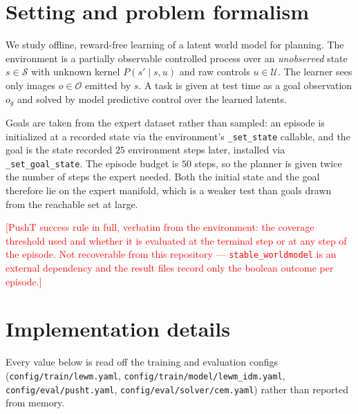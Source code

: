 \documentclass{article}
\newcommand{\todo}[1]{\textcolor{red}{[#1]}}
\begin{document}



\appendix

\section{Setting and problem formalism}
\label{app:setting}

We study offline, reward-free learning of a latent world model for planning. The
environment is a partially observable controlled process over an \emph{unobserved}
state $s \in \mathcal{S}$ with unknown kernel $P(s' \mid s, u)$ and raw controls
$u \in \mathcal{U}$. The learner sees only images $o \in \mathcal{O}$ emitted by
$s$. A task is given at test time as a goal observation $o_g$ and solved by model
predictive control over the learned latents.

Goals are taken from the expert dataset rather than sampled: an episode is
initialized at a recorded state via the environment's \texttt{\_set\_state}
callable, and the goal is the state recorded $25$ environment steps later,
installed via \texttt{\_set\_goal\_state}. The episode budget is $50$ steps, so
the planner is given twice the number of steps the expert needed. Both the
initial state and the goal therefore lie on the expert manifold, which is a
weaker test than goals drawn from the reachable set at large.

\todo{PushT success rule in full, verbatim from the environment: the coverage
threshold used and whether it is evaluated at the terminal step or at any step
of the episode. Not recoverable from this repository --- \texttt{stable\_worldmodel}
is an external dependency and the result files record only the boolean outcome
per episode.}

\section{Implementation details}
\label{app:impl}

Every value below is read off the training and evaluation configs
(\texttt{config/train/lewm.yaml}, \texttt{config/train/model/lewm\_idm.yaml},
\texttt{config/eval/pusht.yaml}, \texttt{config/eval/solver/cem.yaml}) rather
than reported from memory.
\end{document}
